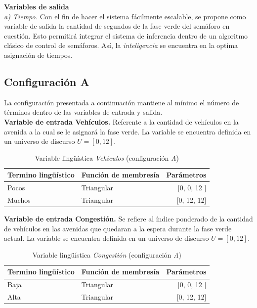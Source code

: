 \textbf{Variables de salida}\\
\textit{a) Tiempo.} Con el fin de hacer el sistema fácilmente escalable, se propone como variable de salida la cantidad de segundos de la fase verde del semáforo en cuestión. Esto permitirá integrar el sistema de inferencia dentro de un algoritmo clásico de control de semáforos. Así, la \textit{inteligencia} se encuentra en la optima asignación de tiempos.

\newpage
\subsection{Configuración A}
La configuración presentada a continuación mantiene al mínimo el número de términos dentro de las variables de entrada y salida.\\

\textbf{Variable de entrada Vehículos.} Referente a la cantidad de vehículos en la avenida a la cual se le asignará la fase verde. La variable se encuentra definida en un universo de discurso $U = [0,12]$.\\

\begin{table}[!h]
	\centering
	\begin{tabular}{llr} \toprule
		Termino lingüístico & Función de membresía & Parámetros \\ \midrule
		Pocos & Triangular & [0, 0, 12 ] \\
		Muchos & Triangular & [0, 12, 12] \\ \bottomrule
	\end{tabular}
	\caption{Variable lingüística \textit{Vehículos} (configuración \textit{A})}
\end{table}

\textbf{Variable de entrada Congestión.} Se refiere al índice ponderado de la cantidad de vehículos en las avenidas que quedaran a la espera durante la fase verde actual. La variable se encuentra definida en un universo de discurso $U = [0,12]$.\\

\begin{table}[!h]
	\centering
	\begin{tabular}{llr} \toprule
		Termino lingüístico & Función de membresía & Parámetros \\ \midrule
		Baja & Triangular & [0, 0, 12 ] \\
		Alta & Triangular & [0, 12, 12] \\ \bottomrule
	\end{tabular}
	\caption{Variable lingüística \textit{Congestión} (configuración \textit{A})}
\end{table}

